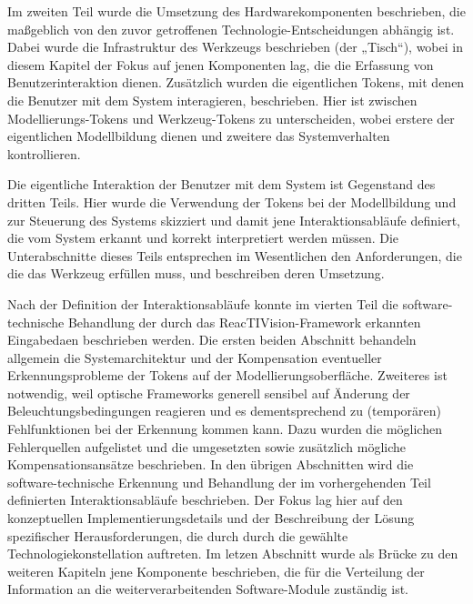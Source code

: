 Im zweiten Teil wurde die Umsetzung des Hardwarekomponenten beschrieben, die maßgeblich von den zuvor getroffenen Technologie-Entscheidungen abhängig ist. Dabei wurde die Infrastruktur des Werkzeugs beschrieben (der „Tisch“), wobei in diesem Kapitel der Fokus auf jenen Komponenten lag, die die Erfassung von Benutzerinteraktion dienen. Zusätzlich wurden die eigentlichen Tokens, mit denen die Benutzer mit dem System interagieren, beschrieben. Hier ist zwischen Modellierungs-Tokens und Werkzeug-Tokens zu unterscheiden, wobei erstere der eigentlichen Modellbildung dienen und zweitere das Systemverhalten kontrollieren.

Die eigentliche Interaktion der Benutzer mit dem System ist Gegenstand des dritten Teils. Hier wurde die Verwendung der Tokens bei der Modellbildung und zur Steuerung des Systems skizziert und damit jene Interaktionsabläufe definiert, die vom System erkannt und korrekt interpretiert werden müssen. Die Unterabschnitte dieses Teils entsprechen im Wesentlichen den Anforderungen, die die das Werkzeug erfüllen muss, und beschreiben deren Umsetzung.

Nach der Definition der Interaktionsabläufe konnte im vierten Teil die software-technische Behandlung der durch das ReacTIVision-Framework erkannten Eingabedaen beschrieben werden. Die ersten beiden Abschnitt behandeln allgemein die Systemarchitektur und der Kompensation eventueller Erkennungsprobleme der Tokens auf der Modellierungsoberfläche. Zweiteres ist notwendig, weil optische Frameworks generell sensibel auf Änderung der Beleuchtungsbedingungen reagieren und es dementsprechend zu (temporären) Fehlfunktionen bei der Erkennung kommen kann. Dazu wurden die möglichen Fehlerquellen aufgelistet und die umgesetzten sowie zusätzlich mögliche Kompensationsansätze beschrieben. In den übrigen Abschnitten wird die software-technische Erkennung und Behandlung der im vorhergehenden Teil definierten Interaktionsabläufe beschrieben. Der Fokus lag hier auf den konzeptuellen Implementierungsdetails und der Beschreibung der Lösung spezifischer Herausforderungen, die durch durch die gewählte Technologiekonstellation auftreten. Im letzen Abschnitt wurde als Brücke zu den weiteren Kapiteln jene Komponente beschrieben, die für die Verteilung der Information an die weiterverarbeitenden Software-Module zuständig ist.



